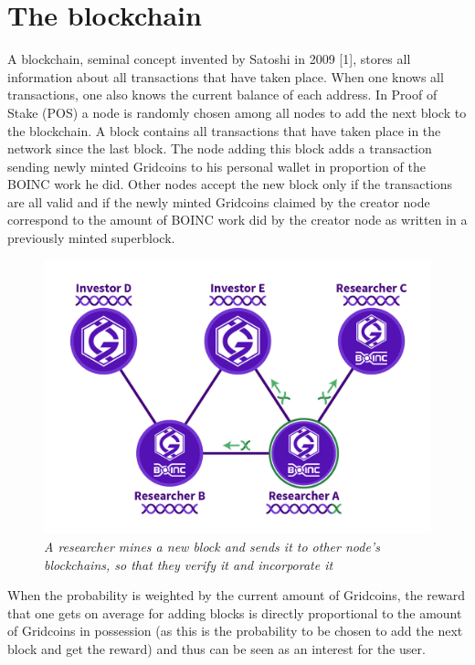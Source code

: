 \section{The blockchain}

A blockchain, seminal concept invented by Satoshi in 2009 [1], stores all information about all transactions that have taken place. When one knows all transactions, one also knows the current balance of each address. In Proof of Stake (POS) a node is randomly chosen among all nodes to add the next block to the blockchain. A block contains all transactions that have taken place in the network since the last block. The node adding this block adds a transaction sending newly minted Gridcoins to his personal wallet in proportion of the BOINC work he did. Other nodes accept the new block only if the transactions are all valid and if the newly minted Gridcoins claimed by the creator node correspond to the amount of BOINC work did by the creator node as written in a previously minted superblock. 

\begin{figure}
\centering
\includegraphics[scale=0.5]{figures/NetworkAndNodes_joshoeah}
\medskip
\caption{\textit{A researcher mines a new block and sends it to other node's blockchains, so that they verify it and incorporate it}}
\small
\end{figure}
 
When the probability is weighted by the current amount of Gridcoins, the reward that one gets on average for adding blocks is directly proportional to the amount of Gridcoins in possession (as this is the probability to be chosen to add the next block and get the reward) and thus can be seen as an interest for the user.
